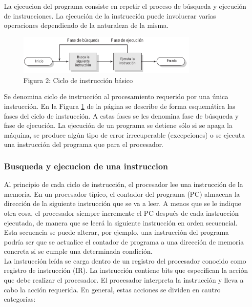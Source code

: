 \documentclass{article}
\begin{document}
				La ejecucion del programa consiste en repetir el proceso de búsqueda y ejecución de instrucciones. La ejecución de la instrucción puede involucrar varias operaciones dependiendo de la naturaleza de la misma. \\
				
				\begin{figure}
				\caption{Figura 2: Ciclo de instrucción básico}
				\label{figura2:instrucción}
				\centering
				\includegraphics[width=0.8\textwidth, scale=1]{Figura2.png}
				\end{figure}
				
				Se denomina ciclo de instrucción al procesamiento requerido por una única instrucción. En la Figura \ref{figura2:instrucción} de la página \pageref{figura2:instrucción} se describe de forma esquemática las fases del ciclo de instrucción. A estas fases se les denomina fase de búsqueda y fase de ejecución. La ejecución de un programa se detiene sólo si se apaga la máquina, se produce algún tipo de error irrecuperable (excepciones) o se ejecuta una instrucción del programa que para el procesador. \\
				
				\subsubsection{Busqueda y ejecucion de una instruccion}
					Al principio de cada ciclo de instrucción, el procesador lee una instrucción de la memoria. En un procesador típico, el contador del programa (PC) almacena la dirección de la siguiente instrucción que se va a leer. A menos que se le indique otra cosa, el procesador siempre incremente el PC después de cada instrucción ejecutada, de manera que se leerá la siguiente instrucción en orden secuencial. Esta secuencia se puede alterar, por ejemplo, una instrucción del programa podría ser que se actualice el contador de programa a una dirección de memoria concreta si se cumple una determinada condición. \\
					
					La instrucción leída se carga dentro de un registro del procesador conocido como registro de instrucción (IR). La instrucción contiene bits que especifican la acción que debe realizar el procesador. El procesador interpreta la instrucción y lleva a cabo la acción requerida. En general, estas acciones se dividen en cautro categorías:
					
\end{document}
